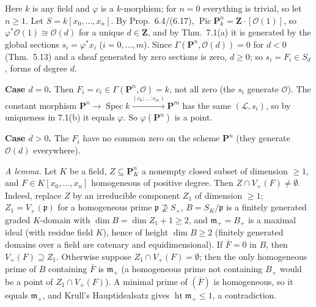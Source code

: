 \documentclass[11pt]{article}
\begin{document}
\pf
Here $k$ is any field and $\varphi$ is a $k$-morphism; for $n=0$ everything is trivial, so let $n\ge1$. Let $S=k[x_0,\dots,x_n]$. By Prop.~6.4/(6.17), $\operatorname{Pic}\mathbf P^n_k=\mathbf Z\cdot[\mathcal O(1)]$, so $\varphi^*\mathcal O(1)\cong\mathcal O(d)$ for a unique $d\in\mathbf Z$, and by Thm.~7.1(a) it is generated by the global sections $s_i=\varphi^*x_i$ ($i=0,\dots,m$). Since $\Gamma(\mathbf P^n,\mathcal O(d))=0$ for $d<0$ (Thm.~5.13) and a sheaf generated by zero sections is zero, $d\ge0$; so $s_i=F_i\in S_d$, forms of degree $d$.

\textbf{Case $d=0$.} Then $F_i=c_i\in\Gamma(\mathbf P^n,\mathcal O)=k$, not all zero (the $s_i$ generate $\mathcal O$). The constant morphism $\mathbf P^n\to\operatorname{Spec}k\xrightarrow{(c_0:\dots:c_m)}\mathbf P^m$ has the same $(\mathcal L,s_i)$, so by uniqueness in 7.1(b) it equals $\varphi$. So $\varphi(\mathbf P^n)$ is a point.

\textbf{Case $d>0$.} The $F_i$ have no common zero on the scheme $\mathbf P^n$ (they generate $\mathcal O(d)$ everywhere).

\emph{A lemma.} Let $K$ be a field, $Z\subseteq\mathbf P^n_K$ a nonempty closed subset of dimension $\ge1$, and $F\in K[x_0,\dots,x_n]$ homogeneous of positive degree. Then $Z\cap V_+(F)\neq\emptyset$. Indeed, replace $Z$ by an irreducible component $Z_1$ of dimension $\ge1$; $Z_1=V_+(\mathfrak p)$ for a homogeneous prime $\mathfrak p\not\supseteq S_+$, $B=S_K/\mathfrak p$ is a finitely generated graded $K$-domain with $\dim B=\dim Z_1+1\ge2$, and $\mathfrak m_+=B_+$ is a maximal ideal (with residue field $K$), hence of height $\dim B\ge2$ (finitely generated domains over a field are catenary and equidimensional). If $\bar F=0$ in $B$, then $V_+(F)\supseteq Z_1$. Otherwise suppose $Z_1\cap V_+(F)=\emptyset$; then the only homogeneous prime of $B$ containing $\bar F$ is $\mathfrak m_+$ (a homogeneous prime not containing $B_+$ would be a point of $Z_1\cap V_+(F)$). A minimal prime of $(\bar F)$ is homogeneous, so it equals $\mathfrak m_+$, and Krull's Hauptidealsatz gives $\operatorname{ht}\mathfrak m_+\le1$, a contradiction.
\end{document}
